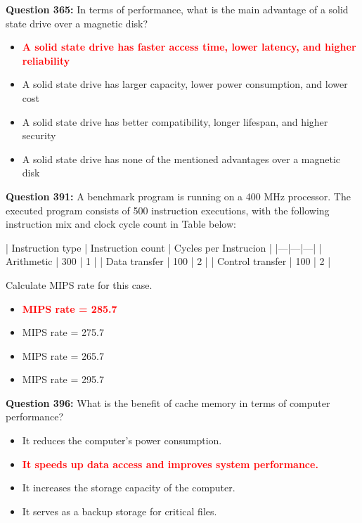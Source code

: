\documentclass[12pt,a4paper]{article}
\begin{document}
\vspace{0.5cm}

\textbf{Question 365:} In terms of performance, what is the main advantage of a solid state drive over a magnetic disk?

\begin{itemize}
    \item[\textbf{A.}] \textcolor{red}{\textbf{A solid state drive has faster access time, lower latency, and higher reliability}}
    \item[\textbf{B.}] A solid state drive has larger capacity, lower power consumption, and lower cost
    \item[\textbf{C.}] A solid state drive has better compatibility, longer lifespan, and higher security
    \item[\textbf{D.}] A solid state drive has none of the mentioned advantages over a magnetic disk
\end{itemize}

\vspace{0.5cm}

\textbf{Question 391:} A benchmark program is running on a 400 MHz processor. The executed program consists of 500 instruction executions, with the following instruction mix and clock cycle count in Table below:

| Instruction type | Instruction count | Cycles per Instrucion |
|---|---|---|
| Arithmetic | 300 | 1 |
| Data transfer | 100 | 2 |
| Control transfer | 100 | 2 |

Calculate MIPS rate for this case.

\begin{itemize}
    \item[\textbf{A.}] \textcolor{red}{\textbf{MIPS rate = 285.7}}
    \item[\textbf{B.}] MIPS rate = 275.7
    \item[\textbf{C.}] MIPS rate = 265.7
    \item[\textbf{D.}] MIPS rate = 295.7
\end{itemize}

\vspace{0.5cm}

\textbf{Question 396:} What is the benefit of cache memory in terms of computer performance?

\begin{itemize}
    \item[\textbf{A.}] It reduces the computer's power consumption.
    \item[\textbf{B.}] \textcolor{red}{\textbf{It speeds up data access and improves system performance.}}
    \item[\textbf{C.}] It increases the storage capacity of the computer.
    \item[\textbf{D.}] It serves as a backup storage for critical files.
\end{itemize}
\end{document}

